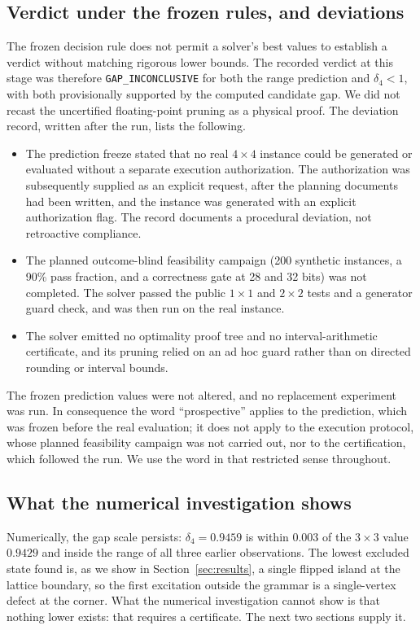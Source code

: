 \documentclass[11pt,a4paper]{article}
\theoremstyle{plain}
\theoremstyle{definition}
\theoremstyle{remark}
\newcommand{\lean}[1]{\nolinkurl{#1}}
\begin{document}
\subsection{Verdict under the frozen rules, and deviations}
The frozen decision rule does not permit a solver's best values to establish a verdict without matching rigorous lower bounds. The recorded verdict at this stage was therefore \lean{GAP_INCONCLUSIVE} for both the range prediction and $\delta_4<1$, with both provisionally supported by the computed candidate gap. We did not recast the uncertified floating-point pruning as a physical proof. The deviation record, written after the run, lists the following.
\begin{itemize}
\item The prediction freeze stated that no real $4\times4$ instance could be generated or evaluated without a separate execution authorization. The authorization was subsequently supplied as an explicit request, after the planning documents had been written, and the instance was generated with an explicit authorization flag. The record documents a procedural deviation, not retroactive compliance.
\item The planned outcome-blind feasibility campaign (200 synthetic instances, a 90\% pass fraction, and a correctness gate at 28 and 32 bits) was not completed. The solver passed the public $1\times1$ and $2\times2$ tests and a generator guard check, and was then run on the real instance.
\item The solver emitted no optimality proof tree and no interval-arithmetic certificate, and its pruning relied on an ad hoc guard rather than on directed rounding or interval bounds.
\end{itemize}
The frozen prediction values were not altered, and no replacement experiment was run. In consequence the word ``prospective'' applies to the prediction, which was frozen before the real evaluation; it does not apply to the execution protocol, whose planned feasibility campaign was not carried out, nor to the certification, which followed the run. We use the word in that restricted sense throughout.

\subsection{What the numerical investigation shows}
Numerically, the gap scale persists: $\delta_4=0.9459$ is within 0.003 of the $3\times3$ value $0.9429$ and inside the range of all three earlier observations. The lowest excluded state found is, as we show in Section~\ref{sec:results}, a single flipped island at the lattice boundary, so the first excitation outside the grammar is a single-vertex defect at the corner. What the numerical investigation cannot show is that nothing lower exists: that requires a certificate. The next two sections supply it.
\end{document}
